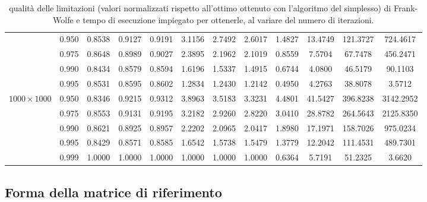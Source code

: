 \begin{landscape}
\begin{table}[!h]
\begin{tabularx}{665.19638pt}{cccccccccccc}
        & 0.950 & 0.8538 & 0.9127 & 0.9191 & 3.1156 & 2.7492 & 2.6017 & 1.4827 & 13.4749 & 121.3727 & 724.4617 \\
        & 0.975 & 0.8648 & 0.8989 & 0.9027 & 2.3895 & 2.1962 & 2.1019 & 0.8559 & 7.5704 & 67.7478 & 456.2471 \\
        & 0.990 & 0.8434 & 0.8579 & 0.8594 & 1.6196 & 1.5337 & 1.4915 & 0.6744 & 4.0800 & 46.5179 & 90.1103 \\
        & 0.995 & 0.8531 & 0.8595 & 0.8602 & 1.2834 & 1.2430 & 1.2142 & 0.4950 & 4.2763 & 38.8078 & 3.5712 \\
        \midrule
        \( 1000\times 1000 \)
        & 0.950 & 0.8346 & 0.9215 & 0.9312 & 3.8963 & 3.5183 & 3.3231 & 4.4801 & 41.5427 & 396.8238 & 3142.2952 \\
        & 0.975 & 0.8553 & 0.9131 & 0.9195 & 3.2182 & 2.9260 & 2.8220 & 3.0410 & 28.8782 & 264.5643 & 2125.8350 \\
        & 0.990 & 0.8621 & 0.8925 & 0.8957 & 2.2202 & 2.0965 & 2.0417 & 1.8980 & 17.1971 & 158.7026 & 975.0234 \\
        & 0.995 & 0.8429 & 0.8571 & 0.8585 & 1.6542 & 1.5738 & 1.5479 & 1.3779 & 12.2042 & 111.4531 & 489.7301 \\
        & 0.999 & 1.0000 & 1.0000 & 1.0000 & 1.0000 & 1.0000 & 1.0000 & 0.6364 & 5.7191 & 51.2325 & 3.6620 \\
        \bottomrule
    \end{tabularx}
    \caption{qualità delle limitazioni (valori normalizzati rispetto all'ottimo ottenuto con l'algoritmo del simplesso)
    di Frank-Wolfe e tempo di esecuzione impiegato per ottenerle, al variare del numero di iterazioni.}
    \label{table:hugetable}
\end{table}
\end{landscape}

\subsection{Forma della matrice di riferimento}
